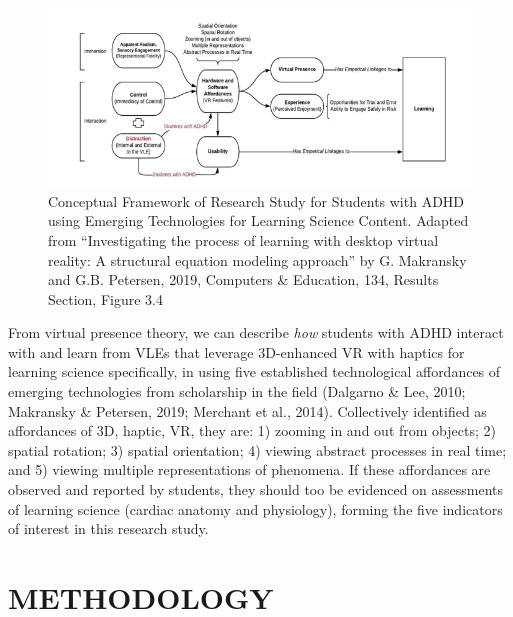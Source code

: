 \documentclass[11.5pt]{sig-alternate} %
\begin{document}
\begin{large}
\begin{figure}[ht]
    \centering
    \includegraphics[width=\textwidth]{Figure 1.png}
    \caption{Conceptual Framework of Research Study for Students with ADHD using Emerging Technologies for Learning Science Content.  Adapted from “Investigating the process of learning with desktop virtual reality: A structural equation modeling approach” by G. Makransky and G.B. Petersen, 2019, Computers \& Education, 134, Results Section, Figure 3.4}
\end{figure}

From virtual presence theory, we can describe \textit{how} students with ADHD interact with and learn from VLEs that leverage 3D-enhanced VR with haptics for learning science specifically, in using five established technological affordances of emerging technologies from scholarship in the field (Dalgarno \& Lee, 2010; Makransky \& Petersen, 2019; Merchant et al., 2014). Collectively identified as affordances of 3D, haptic, VR, they are: 1) zooming in and out from objects; 2) spatial rotation; 3) spatial orientation; 4) viewing abstract processes in real time; and 5) viewing multiple representations of phenomena. If these affordances are observed and reported by students, they should too be evidenced on assessments of learning science (cardiac anatomy and physiology), forming the five indicators of interest in this research study.

\section*{METHODOLOGY}


\end{large}
\end{document}
